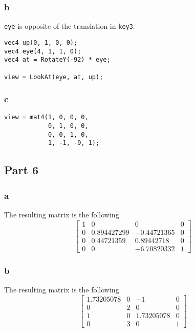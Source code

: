 \subsubsection{b}
\texttt{eye} is opposite of the translation in \texttt{key3}.
\begin{lstlisting}
vec4 up(0, 1, 0, 0);
vec4 eye(4, 1, 1, 0);
vec4 at = RotateY(-92) * eye;

view = LookAt(eye, at, up);
\end{lstlisting}

\subsubsection{c}

\begin{lstlisting}
view = mat4(1, 0, 0, 0,
			0, 1, 0, 0,
			0, 0, 1, 0,
			1, -1, -9, 1);
\end{lstlisting}


\subsection{Part 6}

\subsubsection{a}
The resulting matrix is the following
\[
\left[ {\begin{array}{cccc}
      1 & 0 & 0 & 0 \\
      0 & 0.894427299 & -0.44721365 & 0 \\
      0 & 0.44721359 & 0.89442718 & 0 \\
      0 & 0 & -6.70820332 & 1
    \end{array} } \right]
\]


\subsubsection{b}
The resulting matrix is the following
\[
\left[ {\begin{array}{cccc}
      1.73205078 & 0 & -1 & 0 \\
      0 & 2 & 0 & 0 \\
      1 & 0 & 1.73205078 & 0 \\
      0 & 3 & 0 & 1
    \end{array} } \right]
\]


